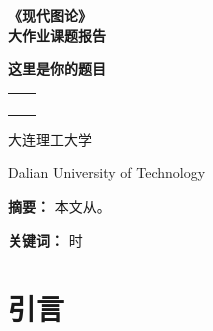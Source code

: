 \documentclass[10pt]{ctexart}
\begin{document}
\begin{titlepage}
	\vspace*{-2cm}
	\flushleft
	\vspace{3.5cm}
	\begin{center}
		\textbf{\song\yihao 《现代图论》\\[15pt] 大作业课题报告}
	\end{center}
	\vspace{3cm}
	\begin{center}
		\erhao \stxihei \parbox[t]{10em}
		{ \textbf{这里是你的题目} }
	\end{center}
	\vspace{2cm}
	\begin{center}
		\song{}
		\renewcommand\arraystretch{1.5}
		\begin{tabular}{p{2.5cm}c}
			\makebox[6em][s]{学生姓名：}  & \underline{\makebox[15em][c]{X}}      \\
			\makebox[6em][s]{学科、专业：} & \underline{\makebox[15em][c]{应用数学}}   \\
			\makebox[6em][s]{学号：}    & \underline{\makebox[15em][c]{x}}      \\
			\makebox[6em][s]{完成日期：}  & \underline{\makebox[15em][c]{\today}} \\
		\end{tabular}
		
		\vspace{3cm}
		{\hwxk \xiaoerhao 大连理工大学}
		
		\vspace*{5pt}
		{ Dalian University of Technology}
	\end{center}
\end{titlepage}





\xiaosihao
\tableofcontents%
\thispagestyle{empty}
\clearpage

\setcounter{page}{1}


\newpage


\textbf{\heiti 摘要：} 本文从。


\textbf{\heiti 关键词：} 时

\section{引言}
\end{document}
